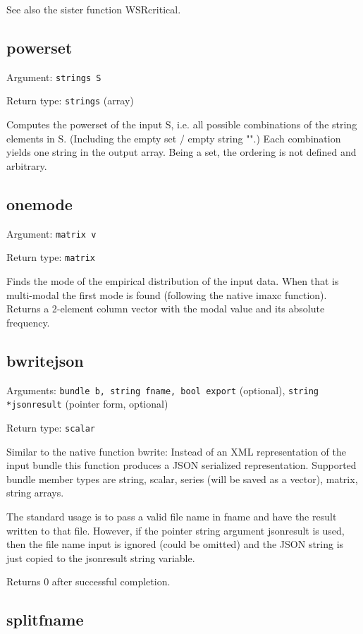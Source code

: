 \documentclass[11pt,english]{article}
\begin{document}
See also the sister function WSRcritical.

\subsection{powerset}

Argument: \texttt{strings S}

\noindent Return type: \texttt{strings} (array)

Computes the powerset of the input S, i.e. all possible combinations 
of the string elements in S. (Including the empty set / 
empty string "".) Each combination yields one string in the output 
array. Being a set, the ordering is not defined and arbitrary. 


\subsection{onemode}

Argument: \texttt{matrix v}

\noindent Return type: \texttt{matrix}

Finds the mode of the empirical distribution of the input data. 
When that is multi-modal the first mode is found (following the native
imaxc function). Returns a 2-element column vector with the modal 
value and its absolute frequency.

\subsection{bwritejson}

Arguments: \texttt{bundle b, string fname, bool export} (optional), 
    \texttt{string *jsonresult} (pointer form, optional)

\noindent Return type: \texttt{scalar}

Similar to the native function bwrite: Instead of an XML representation 
of the input bundle this function produces a JSON serialized representation.
Supported bundle member types are string, scalar, series (will be saved as a
vector), matrix, string arrays.

The standard usage is to pass a valid file name in fname and have the result written 
to that file. However, if the pointer string argument jsonresult is used, then the file name 
input is ignored (could be omitted) and the JSON string is just copied to the jsonresult string 
variable. 

Returns 0 after successful completion.

\subsection{splitfname}
\end{document}
